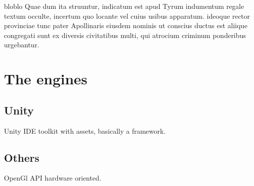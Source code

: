 \documentclass[a4paper,10pt]{beamer}
\begin{document}
			\begin{frame}{bloblo}
				Quae dum ita struuntur, indicatum est apud Tyrum indumentum regale textum occulte, incertum quo locante vel cuius usibus apparatum. ideoque rector provinciae tunc pater Apollinaris eiusdem nominis ut conscius ductus est aliique congregati sunt ex diversis civitatibus multi, qui atrocium criminum ponderibus urgebantur.
			\end{frame}
	
	\section{The engines}
	
		\subsection{Unity}
		
			\begin{frame}{Unity}
				IDE toolkit with assets, basically a framework.
			\end{frame}
			
		\subsection{Others}
			
			\begin{frame}{OpenGl}
				API hardware oriented.
			\end{frame}
	
\end{document}
